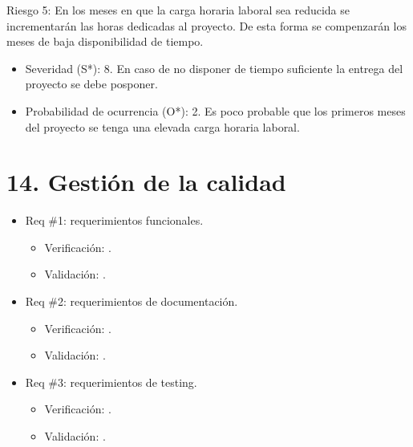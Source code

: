 \documentclass[
11pt, %
codirector, %
]{charter}
\begin{document}
Riesgo 5: En los meses en que la carga horaria laboral sea reducida se incrementarán las horas dedicadas al proyecto. De esta forma se compenzarán los meses de baja disponibilidad de tiempo.
\begin{itemize}
	\item Severidad (S*): 8. En caso de no disponer de tiempo suficiente la entrega del proyecto se debe posponer.
	\item Probabilidad de ocurrencia (O*): 2. Es poco probable que los primeros meses del proyecto se tenga una elevada carga horaria laboral.    
\end{itemize}


\section{14. Gestión de la calidad}
\label{sec:calidad}

\begin{itemize} 
\item Req \#1: requerimientos funcionales.
\begin{itemize}
	\item Verificación: . 
	\item Validación: .  
\end{itemize}
\item Req \#2: requerimientos de documentación.
\begin{itemize}
	\item Verificación: . 
	\item Validación: .  
\end{itemize}
\item Req \#3: requerimientos de testing.
\begin{itemize}
	\item Verificación: . 
	\item Validación: .  
\end{itemize}

\end{itemize}
\end{document}
